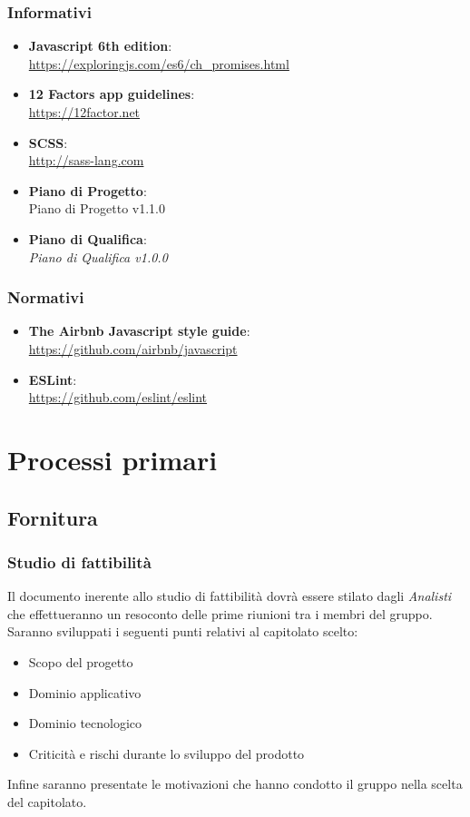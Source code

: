 \subsubsection{Informativi}
\begin{itemize}
\item \textbf{Javascript 6th edition}:\\ \url{https://exploringjs.com/es6/ch\_promises.html}
\item \textbf{12 Factors app guidelines}:\\ \url{https://12factor.net}
\item \textbf{SCSS}: \\ \url{http://sass-lang.com}
\item \textbf{Piano di Progetto}: \\ Piano di Progetto v1.1.0
\item \textbf{Piano di Qualifica}: \\  \emph{Piano di Qualifica v1.0.0} 
\end{itemize}

\subsubsection{Normativi}
\begin{itemize}
\item \textbf{The Airbnb Javascript style guide}: \\ \url{https://github.com/airbnb/javascript}
\item \textbf{ESLint}: \\ \url{https://github.com/eslint/eslint}
\end{itemize}

\section{Processi primari}

\subsection{Fornitura}

\subsubsection{Studio di fattibilità}

Il documento inerente allo studio di fattibilità dovrà essere stilato
dagli  \emph{Analisti}  che effettueranno un resoconto delle prime riunioni tra
i membri del gruppo. Saranno sviluppati i seguenti punti relativi al
capitolato scelto: 
\begin{itemize}
\item Scopo del progetto
\item Dominio applicativo
\item Dominio tecnologico
\item Criticità e rischi durante lo sviluppo del prodotto
\end{itemize}
Infine saranno presentate le motivazioni che hanno condotto il gruppo
nella scelta del capitolato.


